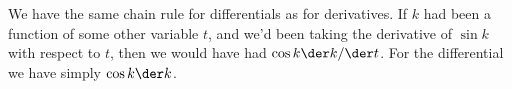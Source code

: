 We have the same chain rule for differentials as for derivatives. If $k$ had been a function of
some other variable $t$, and we'd been taking the derivative
of $\sin k$ with respect to $t$, then we would have had $\cos k \der k/\der t$.
For the differential we have simply $\cos k \der k$.
